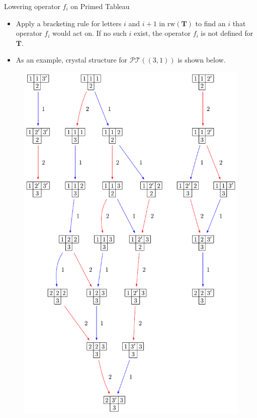 \documentclass[final]{beamer}
\theoremstyle{definition}
\numberwithin{equation}{section}
\newlength{\onecolwid}
\begin{document}
\begin{frame}[t]
\begin{columns}[t]
\begin{column}{\onecolwid}
\begin{block}{Lowering operator $f_i$ on Primed Tableau}
\begin{itemize}
\item Apply a bracketing rule for letters $i$ and $i+1$ in $\mathrm{rw}(\mathbf{T})$ to find an $i$ that operator $f_i$ would act on. If no such $i$ exist, the operator $f_i$ is not defined for $\mathbf{T}$.

\item As an example, crystal structure for $\mathcal{PT} ((3,1))$ is shown below.
\end{itemize}


\begin{figure}
\includegraphics[scale=1.55]{Crystal_Shifted}
\centering
\end{figure}


\end{block}
\end{column}
\end{columns}
\end{frame}
\end{document}
